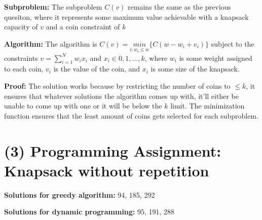 \documentclass[10pt,letterpaper]{article}
\begin{document}
\textbf{Subproblem: }The subproblem $C(v)$ remains the same as the previous quesiton, where it represents some maximum value achievable with a knapsack capacity of $v$ and a coin constraint of $k$

\textbf{Algorithm: }The algorithm is $C(v) = \underset{i: w_{i} \leq w}{min} \{ C(w - w_{i} + v_{i}) \}$ subject to the constraints $v = \sum_{i = 1}^{N} w_{i}x_{i}$ and $x_{i} \in {0, 1, \dots, k}$, where $w_{i}$ is some weight assigned to each coin, $v_{i}$ is the value of the coin, and $x_{i}$ is some size of the knapsack. 

\textbf{Proof: }The solution works because by restricting the number of coins to $\leq k$, it ensures that whatever solutions the algorithm comes up with, it'll either be unable to come up with one or it will be below the $k$ limit. The minimization function ensures that the least amount of coins gets selected for each subproblem. 

\section*{(3) Programming Assignment: Knapsack without repetition}
\textbf{Solutions for greedy algorithm: }94, 185, 292

\textbf{Solutions for dynamic programming: }95, 191, 288
\end{document}
